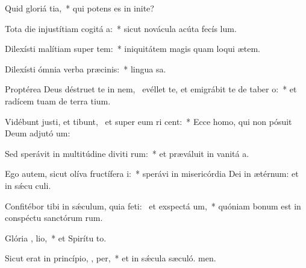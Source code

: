 \item Quid gloriá  tia,~* qui potens es in inite?
\item Tota die injustítiam cogitá  a:~* sicut novácula acúta fecís lum.
\item Dilexísti malítiam super tem:~* iniquitátem magis quam loqui ætem.
\item Dilexísti ómnia verba præcinis:~* lingua sa.
\item Proptérea Deus déstruet te in nem,~\pscross{} evéllet te, et emigrábit te de taber o:~* et radícem tuam de terra tium.
\item Vidébunt justi, et tibunt,~\pscross{} et super eum ri  cent:~* Ecce homo, qui non pósuit Deum adjutó um:
\item Sed sperávit in multitúdine diviti rum:~* et præváluit in vanitá a.
\item Ego autem, sicut olíva fructífera   i:~* sperávi in misericórdia Dei in ætérnum: et in sǽcu culi.
\item Confitébor tibi in sǽculum, quia feti:~\pscross{} et exspectá  um,~* quóniam bonum est in conspéctu sanctórum rum.
\item Glória ,  lio,~* et Spirítu to.
\item Sicut erat in princípio,  ,  per,~* et in sǽcula sæculó. men.

